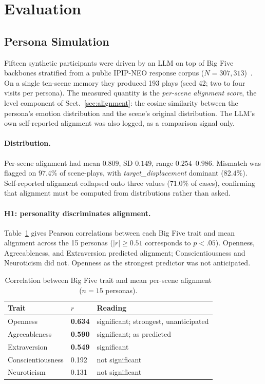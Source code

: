 \documentclass[runningheads]{llncs}
\begin{document}
\section{Evaluation}

\subsection{Persona Simulation}
\label{sec:sim}

Fifteen synthetic participants were driven by an LLM on top of Big Five backbones stratified from a public IPIP-NEO response corpus ($N = 307{,}313$)~\cite{goldberg1999,johnson2014}. On a single ten-scene memory they produced 193 plays (seed 42; two to four visits per persona). The measured quantity is the \emph{per-scene alignment score}, the level component of Sect.~\ref{sec:alignment}: the cosine similarity between the persona's emotion distribution and the scene's original distribution. The LLM's own self-reported alignment was also logged, as a comparison signal only.

\paragraph{Distribution.}
Per-scene alignment had mean $0.809$, SD $0.149$, range $0.254$--$0.986$. Mismatch was flagged on $97.4\%$ of scene-plays, with \emph{target\_displacement} dominant ($82.4\%$). Self-reported alignment collapsed onto three values ($71.0\%$ of cases), confirming that alignment must be computed from distributions rather than asked.

\paragraph{H1: personality discriminates alignment.}
Table~\ref{tab:corr} gives Pearson correlations between each Big Five trait and mean alignment across the 15 personas ($|r| \ge 0.51$ corresponds to $p < .05$). Openness, Agreeableness, and Extraversion predicted alignment; Conscientiousness and Neuroticism did not. Openness as the strongest predictor was not anticipated.

\begin{table}[t]
\caption{Correlation between Big Five trait and mean per-scene alignment ($n = 15$ personas).}
\label{tab:corr}
\centering
\begin{tabular}{@{}lll@{}}
\toprule
\textbf{Trait} & $r$ & \textbf{Reading} \\
\midrule
Openness & \textbf{0.634} & significant; strongest, unanticipated \\
Agreeableness & \textbf{0.590} & significant; as predicted \\
Extraversion & \textbf{0.549} & significant \\
Conscientiousness & 0.192 & not significant \\
Neuroticism & 0.131 & not significant \\
\bottomrule
\end{tabular}
\end{table}
\end{document}

